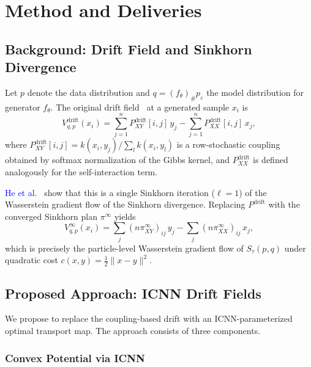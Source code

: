 \documentclass[10pt,conference,compsocconf]{IEEEtran}
\newcommand{\citet}[2]{\textcolor{blue}{#1}~\cite{#2}}
\begin{document}
\section{Method and Deliveries}

\subsection{Background: Drift Field and Sinkhorn Divergence}

Let $p$ denote the data distribution and $q = (f_\theta)_\# p_\varepsilon$ the model distribution for generator $f_\theta$.
The original drift field~\cite{deng2026drifting} at a generated sample $x_i$ is
\begin{equation}\label{eq:drift_original}
  V_{q,p}^{\text{drift}}(x_i) = \sum_{j=1}^n P_{XY}^{\text{drift}}[i,j]\, y_j - \sum_{j=1}^n P_{XX}^{\text{drift}}[i,j]\, x_j,
\end{equation}
where $P_{XY}^{\text{drift}}[i,j] = k(x_i, y_j) / \sum_l k(x_i, y_l)$ is a row-stochastic coupling obtained by softmax normalization of the Gibbs kernel, and $P_{XX}^{\text{drift}}$ is defined analogously for the self-interaction term. 

\citet{He et al.}{he2026sinkhorn} show that this is a single Sinkhorn iteration ($\ell=1$) of the Wasserstein gradient flow of the Sinkhorn divergence.
Replacing $P^{\text{drift}}$ with the converged Sinkhorn plan $\pi^\infty$ yields
\begin{equation}\label{eq:drift_sinkhorn}
  V_{q,p}^{\infty}(x_i) = \sum_j (n\pi_{XY}^\infty)_{ij}\, y_j - \sum_j (n\pi_{XX}^\infty)_{ij}\, x_j,
\end{equation}
which is precisely the particle-level Wasserstein gradient flow of $S_\tau(p,q)$ under quadratic cost $c(x,y) = \tfrac{1}{2}\|x - y\|^2$. 


\subsection{Proposed Approach: ICNN Drift Fields}

We propose to replace the coupling-based drift with an ICNN-parameterized optimal transport map. The approach consists of three components. 

\subsubsection{Convex Potential via ICNN}
\end{document}
